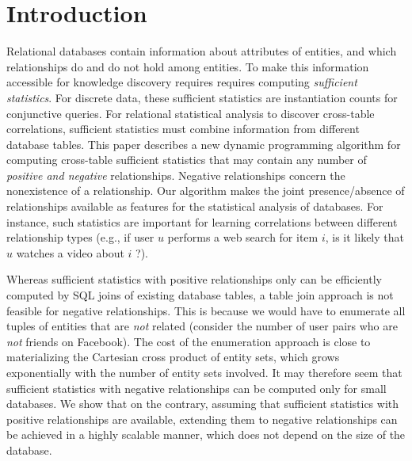 \documentclass{sig-alternate-2013}
\begin{document}
 
\section{Introduction} Relational databases contain information about attributes of entities, and which relationships do and do not hold among entities. To make this information accessible for knowledge discovery requires requires computing {\em sufficient statistics}. For discrete data, these sufficient statistics are instantiation counts for conjunctive queries. 
For relational statistical analysis to discover cross-table correlations,  sufficient statistics must combine information from different database tables. This paper describes a new dynamic programming algorithm for computing cross-table sufficient statistics that may contain any number of {\em positive and negative} relationships. Negative relationships concern the nonexistence of a relationship. Our algorithm makes the joint presence/absence of relationships available as features for the statistical analysis of databases. For instance, such statistics are important for learning correlations between different relationship types (e.g., if user $u$ performs a web search for item $i$, is it likely that $u$ watches a video about $i$ ?). 

Whereas sufficient statistics with positive relationships only can be efficiently computed by SQL joins of existing database tables, a table join approach is not feasible for negative relationships. This is because we would have to enumerate all tuples of entities that are {\em not} related (consider the number of user pairs who are {\em not} friends on Facebook). The cost of the enumeration approach is close to materializing the Cartesian cross product of entity sets, which grows exponentially with the number of entity sets involved. It may therefore seem that sufficient statistics with negative relationships can be computed only for small databases. 
We show that on the contrary, assuming that sufficient statistics with positive relationships are available, extending them to negative relationships can be achieved in a highly scalable manner, which does not depend on the size of the database.
\end{document}
